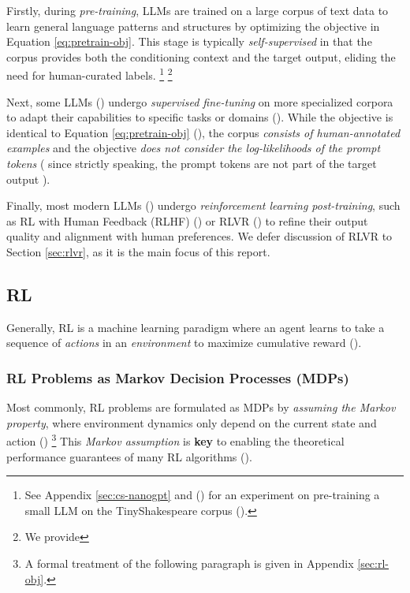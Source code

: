 \documentclass{article} %
\theoremstyle{definition}
\begin{document}
Firstly, during \textit{pre-training}, LLMs are trained on a large corpus of text data
to learn general language patterns and structures by optimizing the objective in Equation \eqref{eq:pretrain-obj}. 
This stage is typically \textit{self-supervised} in that the corpus
provides both the conditioning context and the target output, eliding
the need for human-curated labels. \footnote{
    See Appendix \ref{sec:cs-nanogpt} and (\cite{wk8})
    for an experiment on pre-training a small LLM on the TinyShakespeare corpus (\cite{tinyss, tinyss2}).
}
\footnote{
    We provide 
}

Next, some LLMs (\cite{InstructGPT-2022}) undergo \textit{supervised fine-tuning} on more specialized corpora to adapt 
their capabilities to specific tasks or domains (\cite{radford-et-al-2019,Brown-et-al-2020}).
While the objective is identical to Equation \eqref{eq:pretrain-obj} (\cite{wk5}),
the corpus \textit{consists of human-annotated examples} and 
the objective \textit{does not consider the log-likelihoods of the prompt tokens} (
    since strictly speaking, the prompt tokens are not part of the target output
).

Finally, most modern LLMs (\cite{tulu3, r1}) undergo \textit{reinforcement learning post-training},
such as RL with Human Feedback (RLHF) (\cite{Christiano-et-al-2017, InstructGPT-2022})
or RLVR (\cite{tulu3, grpo, r1}) to refine their output quality and alignment with human preferences.
We defer discussion of RLVR to Section \ref{sec:rlvr}, as it is the main focus of this report.

\subsection{RL}

Generally, RL is a machine learning paradigm
where an agent learns to take a sequence of \textit{actions} 
in an \textit{environment} to maximize cumulative reward (\cite{Sutton-and-Barto-1998}).

\subsubsection{RL Problems as Markov Decision Processes (MDPs)}
Most commonly, RL problems are formulated as MDPs
by \textit{assuming the Markov property}, where environment dynamics
only depend on the current state and action
(\cite{SpinningUp-2018, Levine-et-al-2023, Sutton-and-Barto-1998}) \footnote{
    A formal treatment of the following paragraph is given in Appendix \ref{sec:rl-obj}.
} This \textit{Markov assumption} is \textbf{key} to 
enabling the theoretical performance guarantees of many RL algorithms (\cite{Sutton-and-Barto-1998}).
\end{document}
